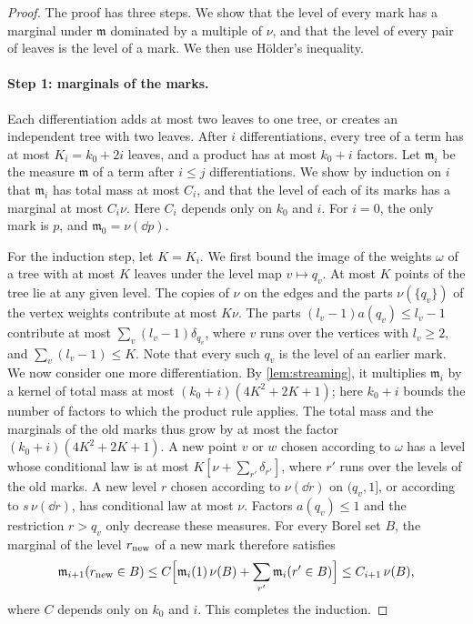 \begin{proof}
The proof has three steps. We show that the level of every mark has a
marginal under $\mathfrak m$ dominated by a multiple of $\nu$, and that
the level of every pair of leaves is the level of a mark. We then use
Hölder's inequality.

\paragraph{Step 1: marginals of the marks.}
Each differentiation adds at most two leaves to one tree, or creates an
independent tree with two leaves. After $i$ differentiations, every tree
of a term has at most $K_i=k_0+2i$ leaves, and a product has at
most $k_0+i$ factors. Let $\mathfrak m_i$ be the measure $\mathfrak m$ of
a term after $i\le j$ differentiations. We show by induction on $i$ that
$\mathfrak m_i$ has total mass at most $C_i$, and that the level of each
of its marks has a marginal at most $C_i\nu$. Here $C_i$ depends only on
$k_0$ and $i$. For $i=0$, the only mark is $p$, and
$\mathfrak m_0=\nu(\dd p)$.

For the induction step, let $K=K_i$. We first bound the image of the
weights $\omega$ of a tree with at most $K$ leaves under the level map
$v\mapsto q_v$. At most $K$ points of the tree lie at any given level.
The copies of $\nu$ on the edges and the parts $\nu(\{q_v\})$ of the
vertex weights contribute at most $K\nu$. The parts
$(l_v-1)a(q_v)\le l_v-1$ contribute at most
$\sum_v(l_v-1)\delta_{q_v}$, where $v$ runs over the vertices with
$l_v\ge2$, and $\sum_v(l_v-1)\le K$. Note that every such $q_v$ is the
level of an earlier mark. We now consider one more differentiation. By
\cref{lem:streaming}, it multiplies $\mathfrak m_i$ by a kernel of total
mass at most $(k_0+i)(4K^2+2K+1)$; here $k_0+i$ bounds the
number of factors to which the product rule applies. The total mass and
the marginals of the old marks thus grow by at most the factor
$(k_0+i)(4K^2+2K+1)$. A new
point $v$ or $w$ chosen according to $\omega$ has a level whose
conditional law is at most $K[\nu+\sum_{r'}\delta_{r'}]$, where $r'$ runs
over the levels of the old marks. A new level $r$ chosen according to
$\nu(\dd r)$ on $(q_v,1]$, or according to $s\,\nu(\dd r)$, has
conditional law at most $\nu$. Factors $a(q_v)\le1$ and the restriction
$r>q_v$ only decrease these measures. For every Borel set $B$, the
marginal of the level $r_{\rm new}$ of a new mark therefore satisfies
\[
 \mathfrak m_{i+1}(r_{\rm new}\in B)
 \le C\Bigl[\mathfrak m_i(1)\,\nu(B)+\sum_{r'}\mathfrak m_i(r'\in B)\Bigr]
 \le C_{i+1}\,\nu(B),
\]
where $C$ depends only on $k_0$ and $i$. This completes the induction.


\end{proof}
